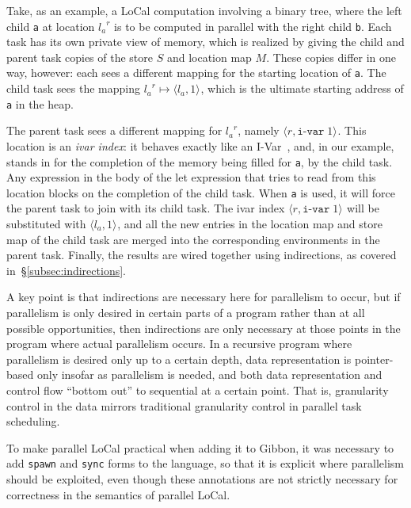 \documentclass[showabstract,showacknowledgments,showpreface,showdedication,school]{iuphd}
\theoremstyle{nonumberplain}
\newcommand{\sysname}[0]{LoCal\xspace}
\newcommand{\ourcalc}[0]{\sysname}
\newcommand{\keywd}[1]{\mathit{#1}}
\newcommand{\gramwd}[1]{\texttt{#1}}
\newcommand{\skeywd}[1]{\mathit{#1}}
\newcommand{\loc}{\skeywd{l}}
\newcommand{\concreteloc}[3]{\ensuremath{\langle #1, #2 \rangle ^{#3}}}
\newcommand{\reg}{\skeywd{r}}
\newcommand{\STOR}{\keywd{S}}
\newcommand{\MENV}{\keywd{M}}
\newcommand{\locreg}[2]{\ensuremath{{#1}^{#2}}}
\newcommand{\indivar}[1]{\gramwd{i-var}\; #1}
\newcommand{\secref}[1]{\S\ref{#1}}
\newcommand{\il}[1]{\lstinline[style=inline,mathescape=true];#1;}
\begin{document}
Take, as an example, a \ourcalc{} computation involving a binary tree, where the
left child \il{a} at location $\locreg{\loc_a}{\reg}$ is to be computed in
parallel with the right child \il{b}.
Each task has its own private view of memory, which is realized by
giving the child and parent task copies of the store $\STOR$ and
location map $\MENV$.
These copies differ in one way, however: each sees a different mapping
for the starting location of \il{a}. The child task sees the mapping
$\locreg{\loc_a}{\reg} \mapsto \concreteloc{\loc_a}{1}{}$, which
is the ultimate starting address of \il{a} in the heap.

The parent task sees a different mapping for $\locreg{\loc_a}{\reg}$,
namely $\concreteloc{\reg}{\indivar{1}}{}$.
This location is an \emph{ivar index}: it behaves exactly like an I-Var~\cite{IStructures},
and, in our example, stands in for the completion of the memory being
filled for \il{a}, by the child task.
Any expression in the body of the let expression that tries to read
from this location blocks on the completion of the child task.
When \il{a} is used, it will force the parent task to join with
its child task. The ivar index $\concreteloc{\reg}{\indivar{1}}{}$
will be substituted with $\concreteloc{\loc_a}{1}{}$, and
all the new entries in the location map and store map of the
child task are merged into the corresponding environments in
the parent task. Finally, the results are wired together using
indirections, as covered in~\secref{subsec:indirections}.

A key point is that indirections are necessary here for parallelism to occur,
but if parallelism is only desired in certain parts of a program rather than at
all possible opportunities, then indirections are only necessary at those points
in the program where actual parallelism occurs. In a recursive program where
parallelism is desired only up to a certain depth, data representation is
pointer-based only insofar as parallelism is needed, and both data
representation and control flow ``bottom out'' to sequential at a certain point.
That is, granularity control in the data mirrors traditional
granularity control in parallel task scheduling.

To make parallel \ourcalc{} practical when adding it to Gibbon, it was
necessary to add \il{spawn} and \il{sync} forms to the language, so
that it is explicit where parallelism should be exploited, even though these
annotations are not strictly necessary for correctness in the semantics of
parallel \ourcalc{}.
\end{document}
